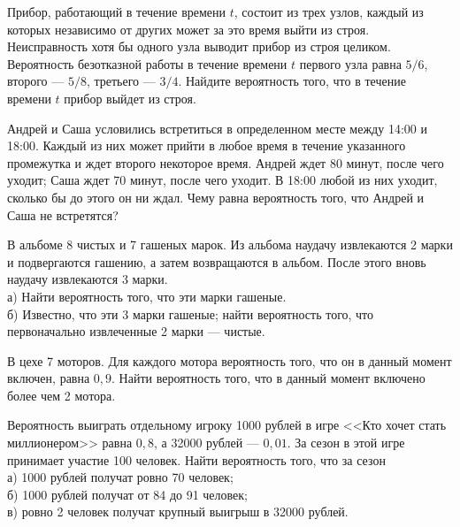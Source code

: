 \newpage\setcounter{zad}{0}



\begin{zkrW}{20}\noindent 
	Прибор, работающий в течение времени $t$, состоит из трех узлов, каждый из которых независимо от других может за это время выйти из строя. Неисправность хотя бы одного узла выводит прибор из строя целиком. Вероятность безотказной работы в течение времени $t$ первого узла равна $5/6$, второго --- $5/8$, третьего --- $3/4$. Найдите вероятность того, что в течение времени $t$ прибор выйдет из строя.
 
\end{zkrW}

\begin{zkrW}{20}\noindent 
	Андрей и Саша условились встретиться в определенном месте между 14:00 и 18:00. Каждый из них может прийти в любое время в течение указанного промежутка и ждет второго некоторое время. Андрей ждет 80 минут, после чего уходит; Саша ждет 70 минут, после чего уходит. В 18:00 любой из них уходит, сколько бы до этого он ни ждал. Чему равна вероятность того, что Андрей и Саша не встретятся?
 
\end{zkrW}

\begin{zkrW}{20}\noindent 
	В альбоме 8 чистых и 7 гашеных марок. Из альбома наудачу извлекаются 2 марки и подвергаются гашению, а затем возвращаются в альбом. После этого вновь наудачу извлекаются 3 марки. \\ \indent а) Найти вероятность того, что эти марки гашеные. \\ \indent б) Известно, что эти 3 марки гашеные; найти вероятность того, что первоначально извлеченные 2 марки --- чистые.
 
\end{zkrW}

\begin{zkrW}{20}\noindent 
	В цехе 7 моторов. Для каждого мотора вероятность того, что он в данный момент включен, равна $0{,}9$. Найти вероятность того, что в данный момент включено более чем 2 мотора.
 
\end{zkrW}

\begin{zkrW}{20}\noindent 
	Вероятность выиграть отдельному игроку 1000 рублей в игре <<Кто хочет стать миллионером>> равна $0{,}8$, а 32000 рублей --- $0{,}01$. За сезон в этой игре принимает участие 100 человек. Найти вероятность того, что за сезон \\ \indent а) 1000 рублей получат ровно 70 человек; \\ \indent б) 1000 рублей получат от 84 до 91 человек; \\ \indent в) ровно 2 человек получат крупный выигрыш в 32000 рублей.
 
\end{zkrW}

